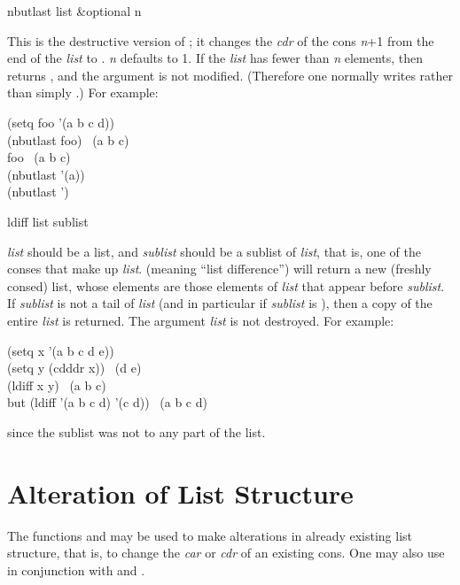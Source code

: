 \begin{defun}[Function]
nbutlast list &optional n

This is the destructive version of ; it changes the {\it cdr} of
the cons {\it n}+1 from the end of the {\it list} to {\nil}.  {\it n} defaults to 1.
If the {\it list} has fewer than {\it n} elements, then 
returns {\emptylist}, and the argument is not modified.  (Therefore
one normally writes  rather than simply
.)
For example:
\begin{lisp}
(setq foo '(a b c d)) \\
(nbutlast foo) \EV\ (a b c) \\
foo \EV\ (a b c) \\
(nbutlast '(a)) \EV\ {\emptylist} \\
(nbutlast '{\nil}) \EV\ {\emptylist}
\end{lisp}
\end{defun}


\begin{defun}[Function]
ldiff list sublist

{\it list} should be a list, and {\it sublist} should be a sublist
of {\it list}, that is, one of the conses that make up {\it list}.
 (meaning ``list difference'') will return a new (freshly consed)
list, whose elements are those elements of {\it list} that appear before
{\it sublist}.  If {\it sublist} is not a tail of {\it list}
(and in particular if {\it sublist} is {\nil}),
then a copy of the entire {\it list} is returned.
The argument {\it list} is not destroyed.
For example:
\begin{lisp}
(setq x '(a b c d e)) \\
(setq y (cdddr x)) \EV\ (d e) \\
(ldiff x y) \EV\ (a b c) \\[4pt]
{\rm but} (ldiff '(a b c d) '(c d)) \EV\ (a b c d)
\end{lisp}
since the sublist was not  to any part of the list.
\end{defun}


\section{Alteration of List Structure}

The functions  and 
may be used to make alterations in already existing
list structure, that is, to change the {\it car} or {\it cdr} of an
existing cons.
One may also use  in conjunction with  and .

